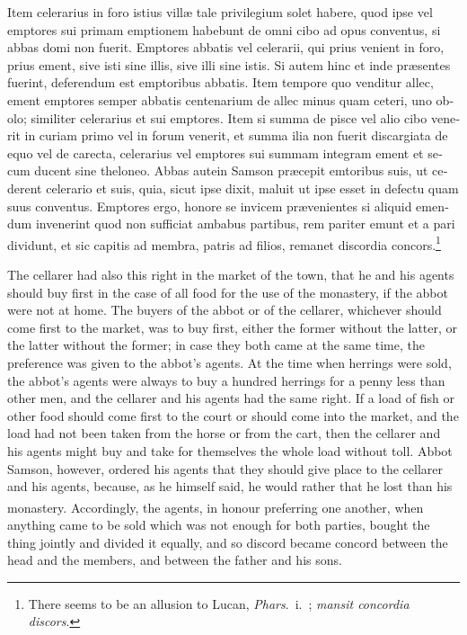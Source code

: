 \documentclass[10pt]{book}
\newcounter{engnote}
\newcommand{\engnotenum}{\textsuperscript{\arabic{engnote}\stepcounter{engnote}}}
\newcommand{\engnotetext}[1]{\vphantom{\footnotemark{}}\footnotetext{#1}}
\begin{document}
\begin{paracol}{2}
\begin{otherlanguage}{latin}
Item celerarius in foro istius vill\ae{} tale privilegium solet habere, quod ipse vel emptores sui primam emptionem habebunt de omni cibo ad opus conventus, si abbas domi non fuerit. Emptores abbatis vel celerarii, qui prius venient in foro, prius ement, sive isti sine illis, sive illi sine istis. Si autem hinc et inde pr\ae{}sentes fuerint, deferendum est emptoribus abbatis. Item tempore quo venditur allec, ement emptores semper abbatis centenarium de allec minus quam ceteri, uno obolo; similiter celerarius et sui emptores. Item si summa de pisce vel alio cibo venerit in curiam primo vel in forum venerit, et summa ilia non fuerit discargiata de equo vel de carecta, celerarius vel emptores sui summam integram ement et secum ducent sine theloneo. Abbas autein Samson pr\ae{}cepit emtoribus suis, ut cederent celerario et suis, quia, sicut ipse dixit, maluit ut ipse esset in defectu quam suus conventus. Emptores ergo, honore se invicem pr\ae{}venientes\engnotetext{Rom.\ xii., \oldstylenums{10}.} si aliquid emendum invenerint quod non sufficiat ambabus partibus, rem pariter emunt et a pari dividunt, et sic capitis ad membra, patris ad filios, remanet discordia concors.\footnote[\textdagger]{There seems to be an allusion to Lucan, \emph{Phars}.\ i.\ ; \emph{mansit concordia discors}.}
\end{otherlanguage}

\switchcolumn

The cellarer had also this right in the market of the town, that he and his agents should buy first in the case of all food for the use of the monastery, if the abbot were not at home. The buyers of the abbot or of the cellarer, whichever should come first to the market, was to buy first, either the former without the latter, or the latter without the former; in case they both came at the same time, the preference was given to the abbot's agents. At the time when herrings were sold, the abbot's agents were always to buy a hundred herrings for a penny less than other men, and the cellarer and his agents had the same right. If a load of fish or other food should come first to the court or should come into the market, and the load had not been taken from the horse or from the cart, then the cellarer and his agents might buy and take for themselves the whole load without toll. Abbot Samson, however, ordered his agents that they should give place to the cellarer and his agents, because, as he himself said, he would rather that he lost than his monastery. Accordingly, the agents, in honour preferring one another,\engnotenum{} when anything came to be sold which was not enough for both parties, bought the thing jointly and divided it equally, and so discord became concord between the head and the members, and between the father and his sons.


\end{paracol}
\end{document}
